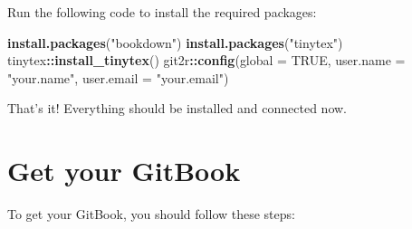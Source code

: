 \documentclass[
]{book}
\newenvironment{Shaded}{\begin{snugshade}}{\end{snugshade}}
\newcommand{\DataTypeTok}[1]{\textcolor[rgb]{0.13,0.29,0.53}{#1}}
\newcommand{\KeywordTok}[1]{\textcolor[rgb]{0.13,0.29,0.53}{\textbf{#1}}}
\newcommand{\NormalTok}[1]{#1}
\newcommand{\OperatorTok}[1]{\textcolor[rgb]{0.81,0.36,0.00}{\textbf{#1}}}
\newcommand{\OtherTok}[1]{\textcolor[rgb]{0.56,0.35,0.01}{#1}}
\newcommand{\StringTok}[1]{\textcolor[rgb]{0.31,0.60,0.02}{#1}}
\begin{document}
Run the following code to install the required packages:

\begin{Shaded}
\begin{Highlighting}[]
\KeywordTok{install.packages}\NormalTok{(}\StringTok{"bookdown"}\NormalTok{)}
\KeywordTok{install.packages}\NormalTok{(}\StringTok{"tinytex"}\NormalTok{)}
\NormalTok{tinytex}\OperatorTok{::}\KeywordTok{install_tinytex}\NormalTok{()}
\NormalTok{git2r}\OperatorTok{::}\KeywordTok{config}\NormalTok{(}\DataTypeTok{global =} \OtherTok{TRUE}\NormalTok{, }\DataTypeTok{user.name =} \StringTok{"your.name"}\NormalTok{, }\DataTypeTok{user.email =} \StringTok{"your.email"}\NormalTok{)}
\end{Highlighting}
\end{Shaded}

That's it! Everything should be installed and connected now.

\hypertarget{getgitbook}{%
\chapter{Get your GitBook}\label{getgitbook}}

To get your GitBook, you should follow these steps:
\end{document}
